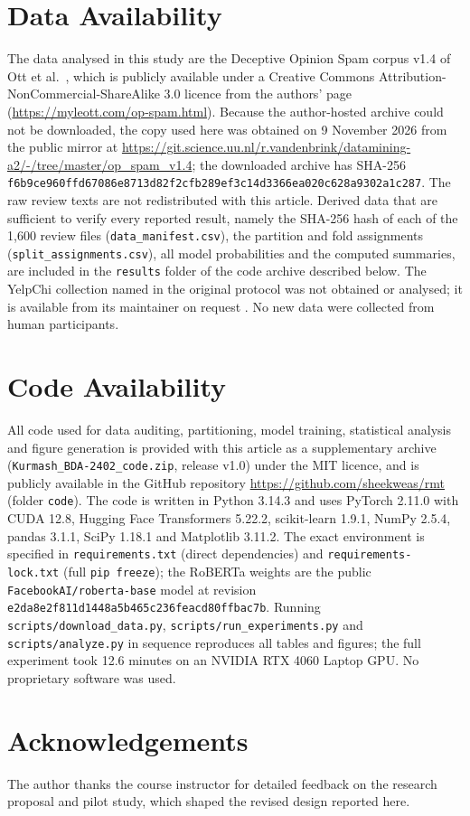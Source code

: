 \section*{Data Availability}
The data analysed in this study are the Deceptive Opinion Spam corpus v1.4 of Ott et al.\ \cite{ref22,ott2013}, which is publicly available under a Creative Commons Attribution-NonCommercial-ShareAlike 3.0 licence from the authors' page (\url{https://myleott.com/op-spam.html}). Because the author-hosted archive could not be downloaded, the copy used here was obtained on 9 November 2026 from the public mirror at \url{https://git.science.uu.nl/r.vandenbrink/datamining-a2/-/tree/master/op_spam_v1.4}; the downloaded archive has SHA-256 \nolinkurl{f6b9ce960ffd67086e8713d82f2cfb289ef3c14d3366ea020c628a9302a1c287}. The raw review texts are not redistributed with this article. Derived data that are sufficient to verify every reported result, namely the SHA-256 hash of each of the 1,600 review files (\texttt{data\_manifest.csv}), the partition and fold assignments (\texttt{split\_assignments.csv}), all model probabilities and the computed summaries, are included in the \texttt{results} folder of the code archive described below. The YelpChi collection named in the original protocol was not obtained or analysed; it is available from its maintainer on request \cite{ref21}. No new data were collected from human participants.

\section*{Code Availability}
All code used for data auditing, partitioning, model training, statistical analysis and figure generation is provided with this article as a supplementary archive (\texttt{Kurmash\_BDA-2402\_code.zip}, release v1.0) under the MIT licence, and is publicly available in the GitHub repository \url{https://github.com/sheekweas/rmt} (folder \texttt{code}). The code is written in Python 3.14.3 and uses PyTorch 2.11.0 with CUDA 12.8, Hugging Face Transformers 5.22.2, scikit-learn 1.9.1, NumPy 2.5.4, pandas 3.1.1, SciPy 1.18.1 and Matplotlib 3.11.2. The exact environment is specified in \texttt{requirements.txt} (direct dependencies) and \texttt{requirements-lock.txt} (full \texttt{pip freeze}); the RoBERTa weights are the public \texttt{FacebookAI/roberta-base} model at revision \nolinkurl{e2da8e2f811d1448a5b465c236feacd80ffbac7b}. Running \nolinkurl{scripts/download_data.py}, \nolinkurl{scripts/run_experiments.py} and \nolinkurl{scripts/analyze.py} in sequence reproduces all tables and figures; the full experiment took 12.6 minutes on an NVIDIA RTX 4060 Laptop GPU. No proprietary software was used.

\section*{Acknowledgements}
The author thanks the course instructor for detailed feedback on the research proposal and pilot study, which shaped the revised design reported here.
